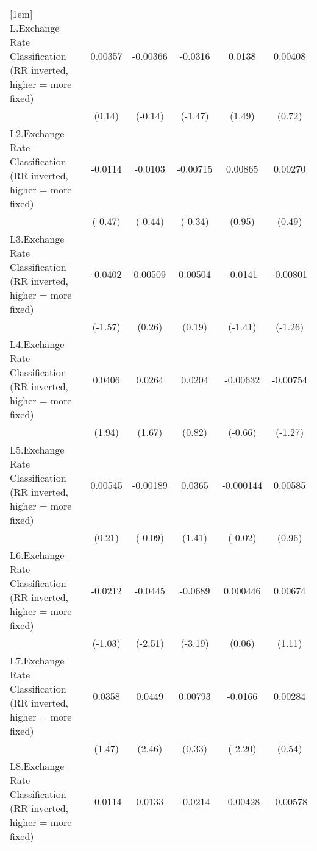 {\begin{tabular}{l*{5}{c}}
[1em]
L.Exchange Rate Classification (RR inverted, higher = more fixed)&  0.00357         & -0.00366         &  -0.0316         &   0.0138         &  0.00408         \\
                &   (0.14)         &  (-0.14)         &  (-1.47)         &   (1.49)         &   (0.72)         \\
[1em]
L2.Exchange Rate Classification (RR inverted, higher = more fixed)&  -0.0114         &  -0.0103         & -0.00715         &  0.00865         &  0.00270         \\
                &  (-0.47)         &  (-0.44)         &  (-0.34)         &   (0.95)         &   (0.49)         \\
[1em]
L3.Exchange Rate Classification (RR inverted, higher = more fixed)&  -0.0402         &  0.00509         &  0.00504         &  -0.0141         & -0.00801         \\
                &  (-1.57)         &   (0.26)         &   (0.19)         &  (-1.41)         &  (-1.26)         \\
[1em]
L4.Exchange Rate Classification (RR inverted, higher = more fixed)&   0.0406         &   0.0264         &   0.0204         & -0.00632         & -0.00754         \\
                &   (1.94)         &   (1.67)         &   (0.82)         &  (-0.66)         &  (-1.27)         \\
[1em]
L5.Exchange Rate Classification (RR inverted, higher = more fixed)&  0.00545         & -0.00189         &   0.0365         &-0.000144         &  0.00585         \\
                &   (0.21)         &  (-0.09)         &   (1.41)         &  (-0.02)         &   (0.96)         \\
[1em]
L6.Exchange Rate Classification (RR inverted, higher = more fixed)&  -0.0212         &  -0.0445\sym{*}  &  -0.0689\sym{**} & 0.000446         &  0.00674         \\
                &  (-1.03)         &  (-2.51)         &  (-3.19)         &   (0.06)         &   (1.11)         \\
[1em]
L7.Exchange Rate Classification (RR inverted, higher = more fixed)&   0.0358         &   0.0449\sym{*}  &  0.00793         &  -0.0166\sym{*}  &  0.00284         \\
                &   (1.47)         &   (2.46)         &   (0.33)         &  (-2.20)         &   (0.54)         \\
[1em]
L8.Exchange Rate Classification (RR inverted, higher = more fixed)&  -0.0114         &   0.0133         &  -0.0214         & -0.00428         & -0.00578         \\

\end{tabular}}
